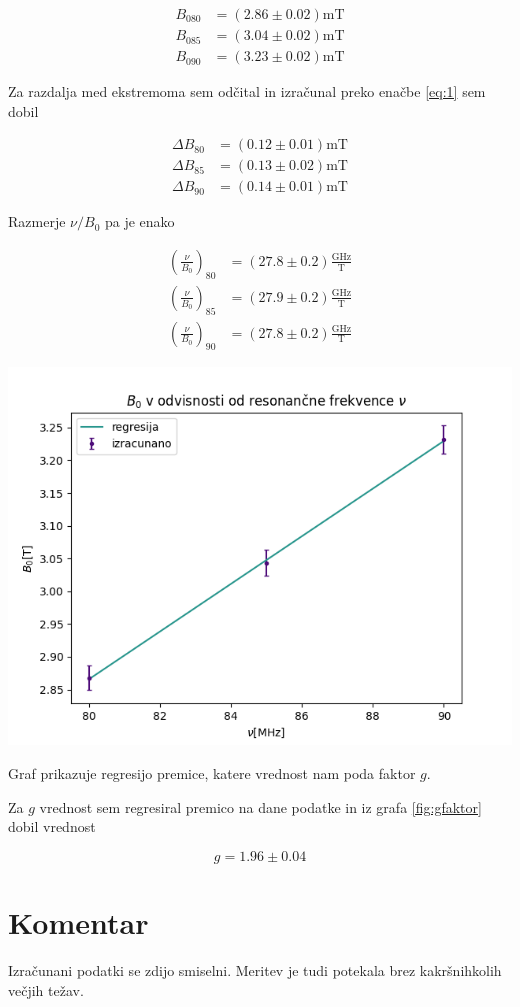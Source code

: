 \documentclass[11pt]{article}
\begin{document}
\begin{align*}
  B_{080} &= (2.86 \pm 0.02) \mathrm{mT} \\
B_{085} &= (3.04 \pm 0.02) \mathrm{mT} \\
B_{090} &= (3.23 \pm 0.02) \mathrm{mT}
\end{align*}

Za razdalja med ekstremoma sem odčital in izračunal preko enačbe \ref{eq:1} sem dobil

\begin{align*}
\Delta B_{80} &=  (0.12 \pm 0.01) \mathrm{mT} \\
\Delta B_{85} &= (0.13 \pm 0.02) \mathrm{mT} \\
\Delta B_{90} &= (0.14 \pm 0.01) \mathrm{mT}
\end{align*}

Razmerje \(\nu / B_0\) pa je enako

\begin{align*}
  \left(\frac{\nu}{B_0}\right)_{80} &= (27.8 \pm 0.2) \frac{\mathrm{GHz}}{\mathrm{T}} \\
  \left(\frac{\nu}{B_0}\right)_{85} &= (27.9 \pm 0.2) \frac{\mathrm{GHz}}{\mathrm{T}}\\
  \left(\frac{\nu}{B_0}\right)_{90} &= (27.8 \pm 0.2) \frac{\mathrm{GHz}}{\mathrm{T}}
\end{align*}

\begin{slika}[H]
  \centering
  \includegraphics[width=.9\linewidth]{figures/gfaktor.png}
  \caption{\small Graf prikazuje regresijo premice, katere vrednost nam poda faktor $g$.}\label{fig:gfaktor}
\end{slika}

Za \(g\) vrednost sem regresiral premico na dane podatke in iz grafa \ref{fig:gfaktor} dobil vrednost

\[ g = 1.96 \pm 0.04
\]

\section{Komentar}\label{sec:org17b2783}

Izračunani podatki se zdijo smiselni. Meritev je tudi potekala brez kakršnihkolih večjih težav.
\end{document}
